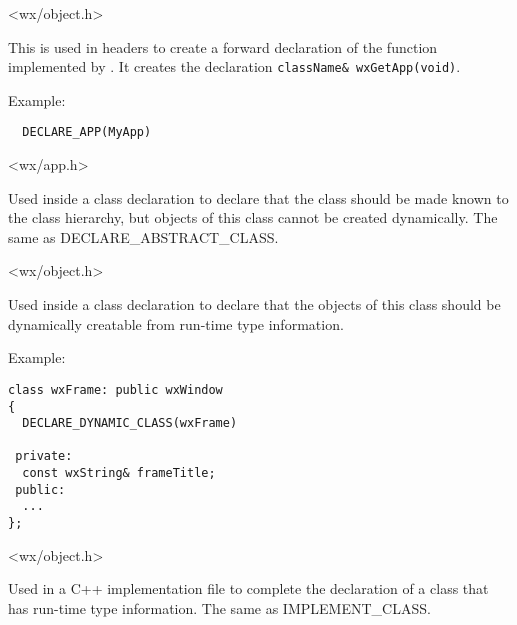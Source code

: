 
<wx/object.h>


\label{declareapp}


This is used in headers to create a forward declaration of the 
 function implemented by 
. It creates the declaration 
{\tt className\& wxGetApp(void)}.

Example:

\begin{verbatim}
  DECLARE_APP(MyApp)
\end{verbatim}


<wx/app.h>


\label{declareclass}


Used inside a class declaration to declare that the class should be
made known to the class hierarchy, but objects of this class cannot be created
dynamically. The same as DECLARE\_ABSTRACT\_CLASS.


<wx/object.h>


\label{declaredynamicclass}


Used inside a class declaration to declare that the objects of this class should be dynamically
creatable from run-time type information.

Example:

\begin{verbatim}
class wxFrame: public wxWindow
{
  DECLARE_DYNAMIC_CLASS(wxFrame)

 private:
  const wxString& frameTitle;
 public:
  ...
};
\end{verbatim}


<wx/object.h>


\label{implementabstractclass}


Used in a C++ implementation file to complete the declaration of
a class that has run-time type information. The same as IMPLEMENT\_CLASS.

